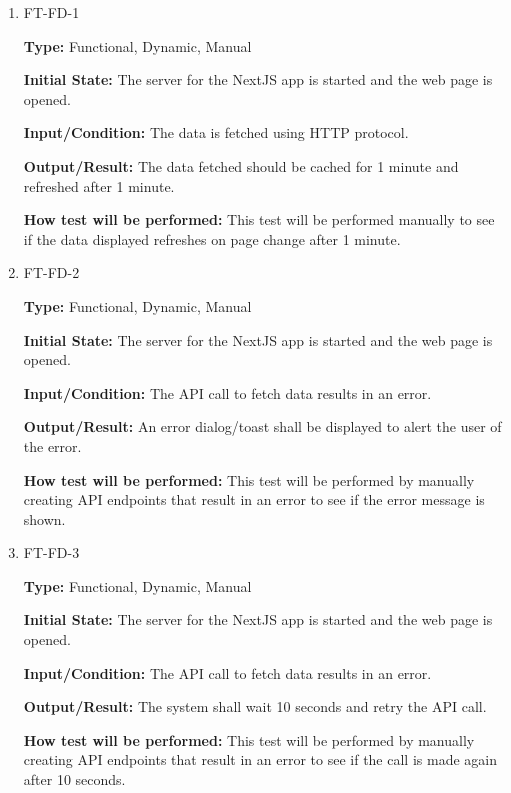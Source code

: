 \documentclass[12pt, titlepage]{article}
\begin{document}
\begin{enumerate}

\item{FT-FD-1}

\textbf{Type:} Functional, Dynamic, Manual
                    
\textbf{Initial State:} The server for the NextJS app is started and the web page is opened.
                    
\textbf{Input/Condition:} The data is fetched using HTTP protocol.
                    
\textbf{Output/Result:} The data fetched should be cached for 1 minute and refreshed after 1 minute.
                    
\textbf{How test will be performed:} This test will be performed manually to see if the data displayed refreshes on page change after 1 minute.


\item{FT-FD-2}

\textbf{Type:} Functional, Dynamic, Manual
                    
\textbf{Initial State:} The server for the NextJS app is started and the web page is opened.
                    
\textbf{Input/Condition:} The API call to fetch data results in an error.
                    
\textbf{Output/Result:} An error dialog/toast shall be displayed to alert the user of the error.
                    
\textbf{How test will be performed:} This test will be performed by manually creating API endpoints that result in an error to see if the error message is shown.

\item{FT-FD-3}

\textbf{Type:} Functional, Dynamic, Manual
                    
\textbf{Initial State:} The server for the NextJS app is started and the web page is opened.
                    
\textbf{Input/Condition:} The API call to fetch data results in an error.
                    
\textbf{Output/Result:} The system shall wait 10 seconds and retry the API call.
                    
\textbf{How test will be performed:} This test will be performed by manually creating API endpoints that result in an error to see if the call is made again after 10 seconds.


\end{enumerate}
\end{document}
